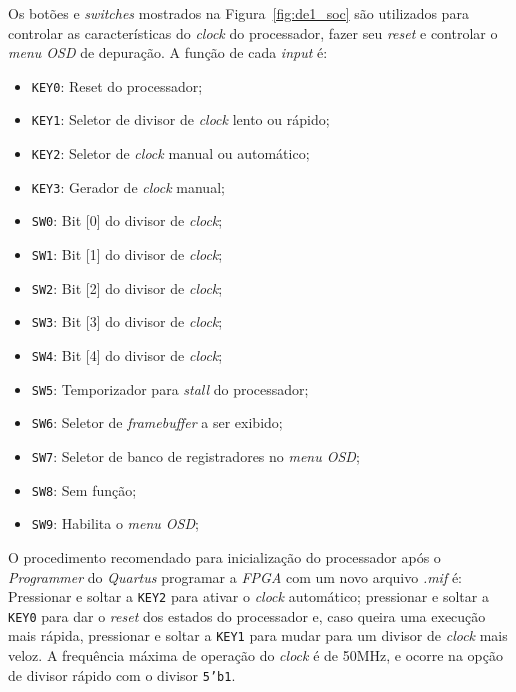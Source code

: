     { Os botões e \textit{switches} mostrados na Figura~\ref{fig:de1_soc} são
        utilizados para controlar as características do \textit{clock} do
        processador, fazer seu \textit{reset} e controlar o \textit{menu OSD}
        de depuração. A função de cada \textit{input} é:
    }
    \begin{itemize}
        \item \texttt{KEY0}: Reset do processador;
        \item \texttt{KEY1}: Seletor de divisor de \textit{clock} lento ou rápido;
        \item \texttt{KEY2}: Seletor de \textit{clock} manual ou automático;
        \item \texttt{KEY3}: Gerador de \textit{clock} manual;
        \item \texttt{SW0}: Bit [0] do divisor de \textit{clock};
        \item \texttt{SW1}: Bit [1] do divisor de \textit{clock};
        \item \texttt{SW2}: Bit [2] do divisor de \textit{clock};
        \item \texttt{SW3}: Bit [3] do divisor de \textit{clock};
        \item \texttt{SW4}: Bit [4] do divisor de \textit{clock};
        \item \texttt{SW5}: Temporizador para \textit{stall} do processador;
        \item \texttt{SW6}: Seletor de \textit{framebuffer} a ser exibido;
        \item \texttt{SW7}: Seletor de banco de registradores no \textit{menu OSD};
        \item \texttt{SW8}: Sem função;
        \item \texttt{SW9}: Habilita o \textit{menu OSD};
    \end{itemize}

    { O procedimento recomendado para inicialização do processador após o
        \textit{Programmer} do \textit{Quartus} programar a \textit{FPGA} com
        um novo arquivo \textit{.mif} é: Pressionar e soltar a \texttt{KEY2}
        para ativar o \textit{clock} automático; pressionar e soltar a
        \texttt{KEY0} para dar o \textit{reset} dos estados do processador e,
        caso queira uma execução mais rápida, pressionar e soltar a \texttt{KEY1}
        para mudar para um divisor de \textit{clock} mais veloz. A frequência
        máxima de operação do \textit{clock} é de 50MHz, e ocorre na opção de
        divisor rápido com o divisor \texttt{5'b1}.
    }

